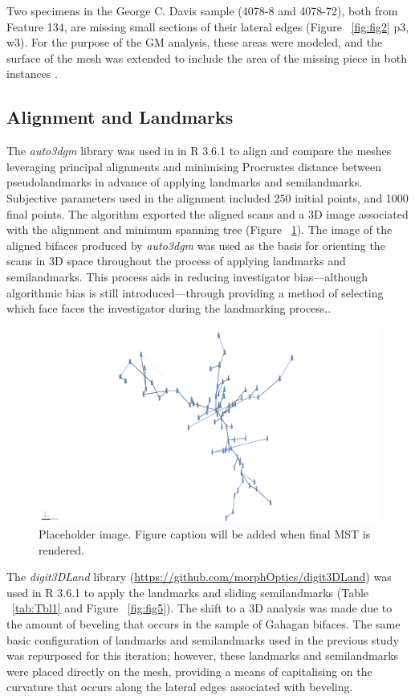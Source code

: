 \documentclass[review]{elsarticle}
\begin{document}
Two specimens in the George C. Davis sample (4078-8 and 4078-72), both from Feature 134, are missing small sections of their lateral edges (Figure ~\ref{fig:fig2} p3, w3). For the purpose of the GM analysis, these areas were modeled, and the surface of the mesh was extended to include the area of the missing piece in both instances \citep{RN20850}.

\subsection*{Alignment and Landmarks}

The \textit{auto3dgm} library \citep{RN20822} was used in in R 3.6.1 \citep{R} to align and compare the meshes leveraging principal alignments and minimising Procrustes distance between pseudolandmarks in advance of applying landmarks and semilandmarks. Subjective parameters used in the alignment included 250 initial points, and 1000 final points. The algorithm exported the aligned scans and a 3D image associated with the alignment and minimum spanning tree (Figure ~\ref{fig:fig4}). The image of the aligned bifaces produced by \textit{auto3dgm} was used as the basis for orienting the scans in 3D space throughout the process of applying landmarks and semilandmarks. This process aids in reducing investigator bias---although algorithmic bias is still introduced---through providing a method of selecting which face faces the investigator during the landmarking process..

\begin{figure}[ht]\centering
\includegraphics[width=\linewidth]{fig04}
\caption{Placeholder image. Figure caption will be added when final MST is rendered.}
\label{fig:fig4}
\end{figure}

The \textit{digit3DLand} library (\href{https://github.com/morphOptics/digit3DLand}{https://github.com/morphOptics/digit3DLand}) was used in R 3.6.1 \citep{R} to apply the landmarks and sliding semilandmarks (Table ~\ref{tab:Tbl1} and Figure ~\ref{fig:fig5}). The shift to a 3D analysis was made due to the amount of beveling that occurs in the sample of Gahagan bifaces. The same basic configuration of landmarks and semilandmarks used in the previous study \citep[Figure 3]{RN11783} was repurposed for this iteration; however, these landmarks and semilandmarks were placed directly on the mesh, providing a means of capitalising on the curvature that occurs along the lateral edges associated with beveling.
\end{document}
